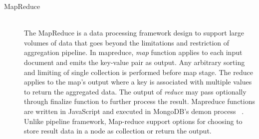 \begin{description}

\item[MapReduce]  \hfill \\
		  The MapReduce is a data processing framework design to support large volumes of data that goes beyond the limitations and restriction of aggregation pipeline.  In mapreduce,  \textit{map} function applies to each input document and emits the key-value pair as output. Any arbitrary sorting and limiting  of single collection is performed before map stage. The reduce applies to the map's output where a key is associated with multiple values to return the aggregated data. The output of \textit{reduce} may pass optionally through finalize function to further process the result. Mapreduce functions are written in JavaScript and executed in MongoDB's demon process ~\cite{mongodbaggregation}.  Unlike pipeline framework, Map-reduce support options for choosing to store result  data in a node as collection or return the output.

\end{description}
